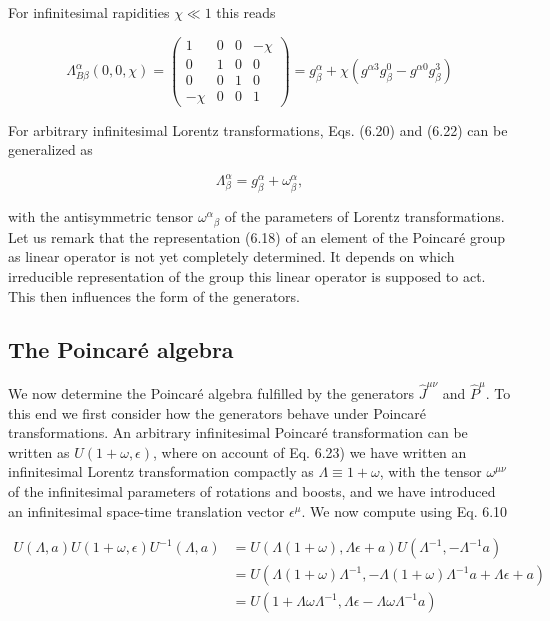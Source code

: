 \documentclass[10pt, letterpaper]{article}
\begin{document}
For infinitesimal rapidities $\chi \ll 1$ this reads

$$
\Lambda_{B \beta}^{\alpha}(0,0, \chi)=\left(\begin{array}{cccc}
1 & 0 & 0 & -\chi \\
0 & 1 & 0 & 0 \\
0 & 0 & 1 & 0 \\
-\chi & 0 & 0 & 1
\end{array}\right)=g_{\beta}^{\alpha}+\chi\left(g^{\alpha 3} g_{\beta}^{0}-g^{\alpha 0} g_{\beta}^{3}\right)
$$

For arbitrary infinitesimal Lorentz transformations, Eqs. (6.20) and (6.22) can be generalized as

$$
\Lambda_{\beta}^{\alpha}=g_{\beta}^{\alpha}+\omega_{\beta}^{\alpha},
$$

with the antisymmetric tensor $\omega^{\alpha}{ }_{\beta}$ of the parameters of Lorentz transformations.\\
Let us remark that the representation (6.18) of an element of the Poincaré group as linear operator is not yet completely determined. It depends on which irreducible representation of the group this linear operator is supposed to act. This then influences the form of the generators.

\subsection{The Poincaré algebra}
We now determine the Poincaré algebra fulfilled by the generators $\hat{J}^{\mu \nu}$ and $\hat{P}^{\mu}$. To this end we first consider how the generators behave under Poincaré transformations. An arbitrary infinitesimal Poincaré transformation can be written as $U(1+\omega, \epsilon)$, where on account of Eq. 6.23) we have written an infinitesimal Lorentz transformation compactly as $\Lambda \equiv 1+\omega$, with the tensor $\omega^{\mu \nu}$ of the infinitesimal parameters of rotations and boosts, and we have introduced an infinitesimal space-time translation vector $\epsilon^{\mu}$. We now compute using Eq. 6.10

$$
\begin{aligned}
U(\Lambda, a) U(1+\omega, \epsilon) U^{-1}(\Lambda, a) & =U(\Lambda(1+\omega), \Lambda \epsilon+a) U\left(\Lambda^{-1},-\Lambda^{-1} a\right) \\
& =U\left(\Lambda(1+\omega) \Lambda^{-1},-\Lambda(1+\omega) \Lambda^{-1} a+\Lambda \epsilon+a\right) \\
& =U\left(1+\Lambda \omega \Lambda^{-1}, \Lambda \epsilon-\Lambda \omega \Lambda^{-1} a\right)
\end{aligned}
$$
\end{document}
